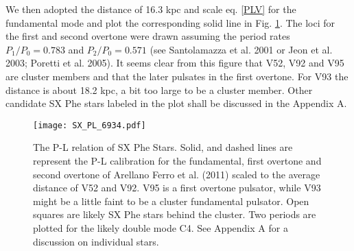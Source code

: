 \documentclass[journal]{rmaa}
\newcommand{\1}{\'{\i}}
\begin{document}
We then adopted the distance of 16.3 kpc and scale eq. \ref{PLV} for the fundamental
mode and plot the corresponding solid line in Fig. \ref{SXphe-PL}. The loci for the
first and
second overtone were drawn assuming the period rates $P_1/P_0 = 0.783$ and $P_2/P_0 =
0.571$ (see Santolamazza et al. 2001 or Jeon et al. 2003; Poretti et al. 2005). It
seems clear from this figure that V52, V92 and V95 are cluster members
and that the later pulsates in the first overtone.
For V93 the distance is about 18.2 kpc, a bit too large to be a cluster member. Other
candidate SX Phe stars
labeled in the plot shall be discussed in the Appendix A.

\begin{figure}
\texttt{[image: SX\_PL\_6934.pdf]}
\caption{The P-L relation of SX Phe Stars. Solid, and dashed lines are represent the
P-L calibration for the fundamental, first overtone and second overtone of Arellano
Ferro et al. (2011) scaled to the average distance of V52 and V92. V95 is a first
overtone pulsator, while V93 might be a little faint to be a cluster fundamental
pulsator. Open squares are likely SX Phe stars behind the cluster. Two periods are
plotted for the likely double mode C4. See Appendix A for a discussion on individual
stars.}
    \label{SXphe-PL}
\end{figure}
\end{document}
